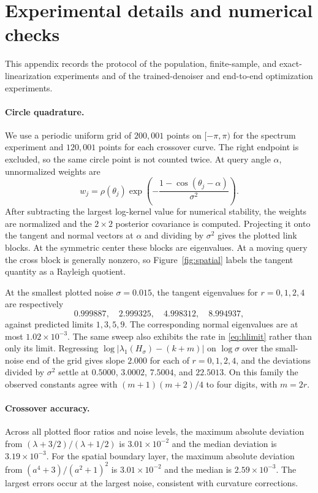 \section{Experimental details and numerical checks}
\label{app:experiments}

This appendix records the protocol of the population, finite-sample, and
exact-linearization experiments and of the trained-denoiser and end-to-end
optimization experiments.

\paragraph{Circle quadrature.}
We use a periodic uniform grid of $200{,}001$ points on $[-\pi,\pi)$ for the
spectrum experiment and $120{,}001$ points for each crossover curve.  The
right endpoint is excluded, so the same circle point is not counted twice.
At query angle $\alpha$, unnormalized weights are
\[
  w_j=
  \rho(\theta_j)
  \exp\!\left(
  -\frac{1-\cos(\theta_j-\alpha)}{\sigma^2}
  \right).
\]
After subtracting the largest log-kernel value for numerical stability, the
weights are normalized and the $2\times2$ posterior covariance is computed.
Projecting it onto the tangent and normal vectors at $\alpha$ and
dividing by $\sigma^2$ gives the plotted link blocks.  At the symmetric center
these blocks are eigenvalues.  At a moving query the cross block is generally
nonzero, so Figure~\ref{fig:spatial} labels the tangent quantity as
a Rayleigh quotient.

At the smallest plotted noise $\sigma=0.015$, the tangent eigenvalues for
$r=0,1,2,4$ are respectively
\[
  0.999887,\quad 2.999325,\quad 4.998312,\quad 8.994937,
\]
against predicted limits $1,3,5,9$.  The corresponding normal eigenvalues are at most $1.02\times10^{-3}$.  The same sweep also exhibits the rate in \eqref{eq:hlimit} rather than only its limit.  Regressing $\log|{\lambda_1(H_\sigma)-(k+m)}|$ on $\log\sigma$ over the small-noise end of the grid gives slope $2.000$ for each of $r=0,1,2,4$, and the deviations divided by $\sigma^2$ settle at $0.5000$, $3.0002$, $7.5004$, and $22.5013$.  On this family the observed constants agree with $(m+1)(m+2)/4$ to four digits, with $m=2r$.

\paragraph{Crossover accuracy.}
Across all plotted floor ratios and noise levels, the maximum absolute deviation from
$(\lambda+3/2)/(\lambda+1/2)$ is $3.01\times10^{-2}$ and the median deviation is $3.19\times10^{-3}$.  For the spatial boundary layer, the maximum absolute deviation from
$(a^4+3)/(a^2+1)^2$ is $3.01\times10^{-2}$ and the median is
$2.59\times10^{-3}$.  The largest errors occur at the largest noise, consistent with curvature corrections.

